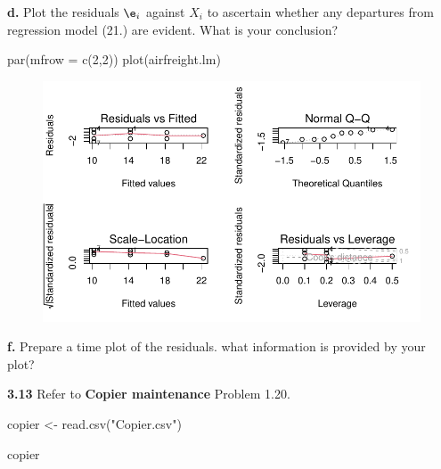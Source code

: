 \documentclass[
  letterpaper,
  DIV=11,
  numbers=noendperiod]{scrartcl}
\newenvironment{Shaded}{\begin{snugshade}}{\end{snugshade}}
\newcommand{\AttributeTok}[1]{\textcolor[rgb]{0.40,0.45,0.13}{#1}}
\newcommand{\DecValTok}[1]{\textcolor[rgb]{0.68,0.00,0.00}{#1}}
\newcommand{\FunctionTok}[1]{\textcolor[rgb]{0.28,0.35,0.67}{#1}}
\newcommand{\NormalTok}[1]{\textcolor[rgb]{0.00,0.23,0.31}{#1}}
\newcommand{\OtherTok}[1]{\textcolor[rgb]{0.00,0.23,0.31}{#1}}
\newcommand{\StringTok}[1]{\textcolor[rgb]{0.13,0.47,0.30}{#1}}
\begin{document}
\textbf{d.} Plot the residuals \(\e_{i}\) against \(X_{i}\) to ascertain
whether any departures from regression model (21.) are evident. What is
your conclusion?

\begin{Shaded}
\begin{Highlighting}[]
\FunctionTok{par}\NormalTok{(}\AttributeTok{mfrow =} \FunctionTok{c}\NormalTok{(}\DecValTok{2}\NormalTok{,}\DecValTok{2}\NormalTok{))}
\FunctionTok{plot}\NormalTok{(airfreight.lm)}
\end{Highlighting}
\end{Shaded}

\begin{figure}[H]

{\centering \includegraphics{sta9700_ch3_hw_files/figure-pdf/unnamed-chunk-13-1.pdf}

}

\end{figure}

\textbf{f.} Prepare a time plot of the residuals. what information is
provided by your plot?

\textbf{3.13} Refer to \textbf{Copier maintenance} Problem 1.20.

\begin{Shaded}
\begin{Highlighting}[]
\NormalTok{copier }\OtherTok{\textless{}{-}} \FunctionTok{read.csv}\NormalTok{(}\StringTok{"Copier.csv"}\NormalTok{)}
\end{Highlighting}
\end{Shaded}

\begin{Shaded}
\begin{Highlighting}[]
\NormalTok{copier}
\end{Highlighting}
\end{Shaded}
\end{document}
